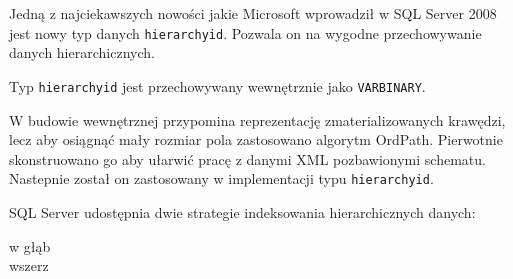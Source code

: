 
Jedną z najciekawszych nowości jakie Microsoft wprowadził w SQL Server 2008 jest nowy typ danych \texttt{hierarchyid}.
Pozwala on na wygodne przechowywanie danych hierarchicznych.







Typ \texttt{hierarchyid} jest przechowywany wewnętrznie jako \texttt{VARBINARY}.

W budowie wewnętrznej przypomina reprezentację zmaterializowanych krawędzi, 
lecz aby osiągnąć mały rozmiar pola zastosowano algorytm OrdPath\cite{ordpath,kumaran}.
Pierwotnie  skonstruowano go aby ułarwić pracę z danymi XML pozbawionymi schematu.
Nastepnie został on zastosowany w implementacji typu \texttt{hierarchyid}.






SQL Server udostępnia dwie strategie indeksowania hierarchicznych danych:
\begin{description}
 \item[w głąb]  
 \item[wszerz]  
 \end{description}



